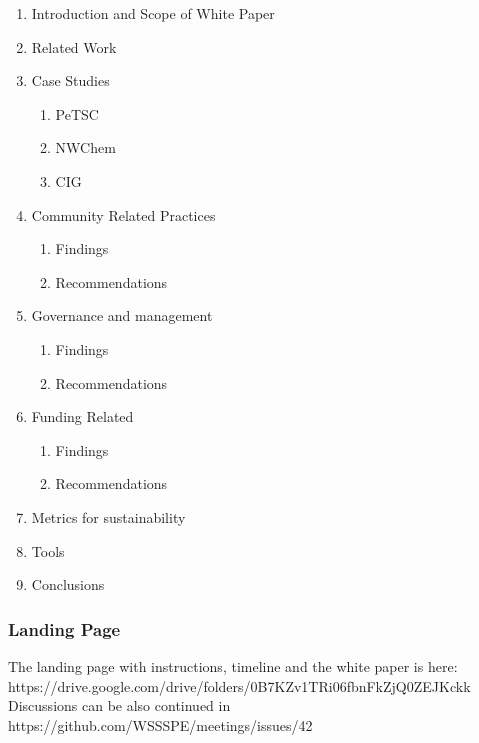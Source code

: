 \begin{enumerate}
\item Introduction and Scope of White Paper 
\item Related Work
\item Case Studies
\begin{enumerate} 
\item PeTSC
\item NWChem
\item CIG
\end{enumerate}
\item Community Related Practices
\begin{enumerate} 
\item Findings
\item Recommendations
\end{enumerate}
\item Governance and management
\begin{enumerate} 
\item Findings
\item Recommendations
\end{enumerate}
\item Funding Related
\begin{enumerate} 
\item Findings
\item Recommendations
\end{enumerate}
\item Metrics for sustainability
\item Tools
\item Conclusions
\end{enumerate}

\subsubsection{Landing Page}
The landing page with instructions, timeline and the white paper is here: https://drive.google.com/drive/folders/0B7KZv1TRi06fbnFkZjQ0ZEJKckk
Discussions can be also continued in https://github.com/WSSSPE/meetings/issues/42
